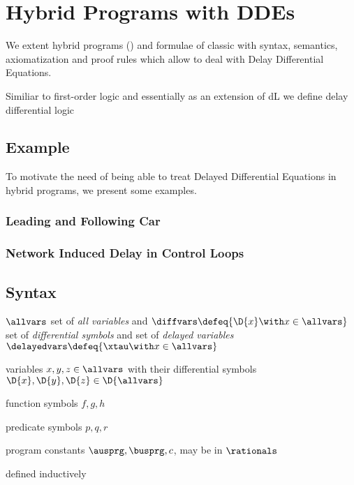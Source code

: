 \chapter{Hybrid Programs with DDEs}\label{hybrid-programs-with-ddes}

We extent hybrid programs (\HPs) and formulae of classic \dL with syntax, semantics, axiomatization and proof rules which allow to deal with Delay Differential Equations.

Similiar to first-order logic and essentially as an extension of dL we define delay differential logic

\section{Example}
    \label{example-hp-cars}
    To motivate the need of being able to treat Delayed Differential Equations in hybrid programs, we present some examples.

    \subsection{Leading and Following Car}

    \subsection{Network Induced Delay in Control Loops}

\section{Syntax}
    \label{sec:syntax}

    $\allvars$ set of \textit{all variables} and $\diffvars\defeq\{\D{x} \with x\in\allvars\}$ set of \textit{differential symbols} and set of \textit{delayed variables} $\delayedvars\defeq\{\xtau \with x\in\allvars\}$

    variables $x,y,z\in\allvars$ with their differential symbols $\D{x},\D{y},\D{z}\in\D{\allvars}$

    function symbols $f,g,h$

    predicate symbols $p,q,r$

    program constants $\ausprg, \busprg, c$, may be in $\rationals$

    defined inductively

